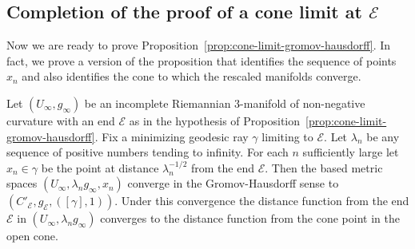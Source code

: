 \subsection{Completion of the proof of a cone limit at ${\mathcal E}$}

Now we are ready to prove Proposition~\ref{prop:cone-limit-gromov-hausdorff}. In fact, we
prove a version of the proposition that identifies the sequence of
points $x_n$ and also identifies the cone to which the
rescaled manifolds converge.

\begin{proposition}
\label{prop:gromov-hausdorff-limit-is-cone}
\label{secondstatment}

Let $(U_\infty,g_\infty)$  be an incomplete Riemannian $3$-manifold
of non-negative curvature with an end ${\mathcal E}$ as in the
hypothesis of Proposition~\ref{prop:cone-limit-gromov-hausdorff}. Fix a minimizing geodesic
ray $\gamma$ limiting to ${\mathcal E}$. Let $\lambda_n$ be any
sequence of positive numbers tending to infinity. For each $n$
sufficiently large let $x_n\in \gamma$ be the point at distance
$\lambda_n^{-1/2}$ from the end ${\mathcal E}$. Then the based
metric spaces $(U_\infty,\lambda_ng_\infty,x_n)$ converge in the
Gromov-Hausdorff sense to
$\left( C'_{\mathcal E},g_{\mathcal E},([\gamma],1)\right)$. Under
this convergence the distance function from the end ${\mathcal E}$
in $(U_\infty,\lambda_ng_\infty)$ converges to the distance function
from the cone point in the open cone.
\end{proposition}


